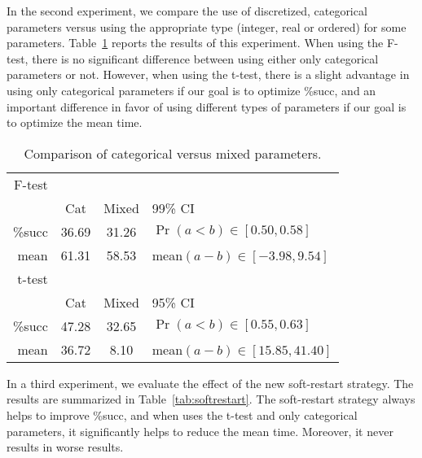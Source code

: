 In the second experiment, we compare the use of discretized,
categorical parameters versus using the appropriate type (integer,
real or ordered) for some parameters. Table~\ref{tab:catmixed} reports
the results of this experiment. When using the F-test, there is no
significant difference between using either only categorical
parameters or not. However, when using the t-test, there is a slight
advantage in using only categorical parameters if our goal is to
optimize \%succ, and an important difference in favor of using
different types of parameters if our goal is to optimize the mean
time.

\begin{table}[tp]
  \caption{Comparison of categorical versus mixed parameters.}
  \label{tab:catmixed}
  \centering
  \begin{tabular}{rccl}
    \toprule
F-test\\
    & Cat & Mixed  & 99\% CI\\\midrule
    \%succ & 36.69 & 31.26& $\Pr(a < b) \in [0.50, 0.58]$\\
    mean   & 61.31 & 58.53& mean$(a-b) \in [-3.98, 9.54]$\\
\midrule
t-test\\
           & Cat & Mixed  & 95\% CI\\\midrule
    \%succ & 47.28 & 32.65 & $\Pr(a < b) \in[0.55,  0.63]$\\
    mean   & 36.72 & 8.10  & mean$(a-b) \in [15.85, 41.40]$\\
\bottomrule
\end{tabular}
\end{table}

In a third experiment, we evaluate the effect of the new soft-restart
strategy. The results are summarized in
Table~\ref{tab:softrestart}. The soft-restart strategy always helps to
improve \%succ, and when \irace uses the t-test and only categorical
parameters, it significantly helps to reduce the mean time. Moreover,
it never results in worse results.

